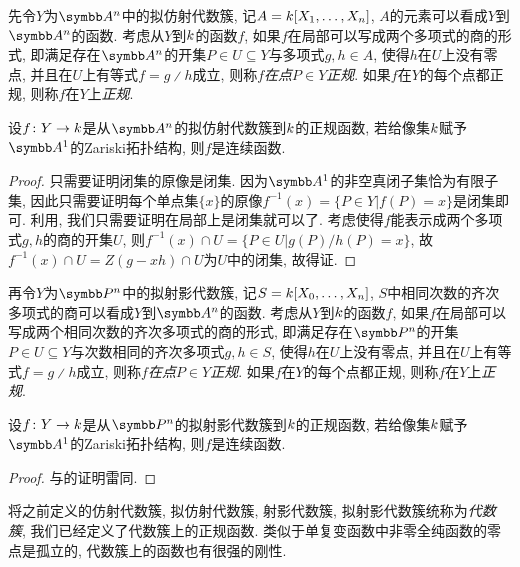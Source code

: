 先令$Y$为$\AF^n$中的拟仿射代数簇, 记$A=k [X_1, \dotsc, X_n]$, $A$的元素可以看成$Y$到$\AF^n$的函数. 考虑从$Y$到$k$的函数$f$, 如果$f$在局部可以写成两个多项式的商的形式, 即满足存在$\AF^n$的开集$P\in U\subseteq Y$与多项式$g, h\in A$, 使得$h$在$U$上没有零点, 并且在$U$上有等式$f=g{\divslash}h$成立, 则称$f$\emph{在点$P\in Y$正规}. 如果$f$在$Y$的每个点都正规, 则称$f$在$Y$上\emph{正规}.

\begin{proposition}\label{prop:affineregularcontinuous}
    设$f\colon Y\to k$是从$\AF^n$的拟仿射代数簇到$k$的正规函数, 若给像集$k$赋予$\AF^1$的Zariski拓扑结构, 则$f$是连续函数.
\end{proposition}

\begin{proof}
    只需要证明闭集的原像是闭集. 因为$\AF^1$的非空真闭子集恰为有限子集, 因此只需要证明每个单点集$\{x\}$的原像$f^{-1}(x)=\{P\in Y\vert f(P)=x\}$是闭集即可. 利用, 我们只需要证明在局部上是闭集就可以了. 考虑使得$f$能表示成两个多项式$g, h$的商的开集$U$, 则$f^{-1}(x)\cap U=\{P\in U\vert g(P)/h(P)=x\}$, 故$f^{-1}(x)\cap U=Z(g-xh)\cap U$为$U$中的闭集, 故得证.
\end{proof}

再令$Y$为$\PP^n$中的拟射影代数簇, 记$S=k [X_0, \dotsc, X_n]$, $S$中相同次数的齐次多项式的商可以看成$Y$到$\AF^n$的函数. 考虑从$Y$到$k$的函数$f$, 如果$f$在局部可以写成两个相同次数的齐次多项式的商的形式, 即满足存在$\PP^n$的开集$P\in U\subseteq Y$与次数相同的齐次多项式$g, h\in S$, 使得$h$在$U$上没有零点, 并且在$U$上有等式$f=g{\divslash}h$成立, 则称$f$\emph{在点$P\in Y$正规}. 如果$f$在$Y$的每个点都正规, 则称$f$在$Y$上\emph{正规}.

\begin{proposition}\label{prop:projregularcontinuous}
    设$f\colon Y\to k$是从$\PP^n$的拟射影代数簇到$k$的正规函数, 若给像集$k$赋予$\AF^1$的Zariski拓扑结构, 则$f$是连续函数.
\end{proposition}

\begin{proof}
    与的证明雷同.
\end{proof}

将之前定义的仿射代数簇, 拟仿射代数簇, 射影代数簇, 拟射影代数簇统称为\emph{代数簇}, 我们已经定义了代数簇上的正规函数. 类似于单复变函数中非零全纯函数的零点是孤立的\parencite[127]{ahlfors_complex_1978}, 代数簇上的函数也有很强的刚性.

